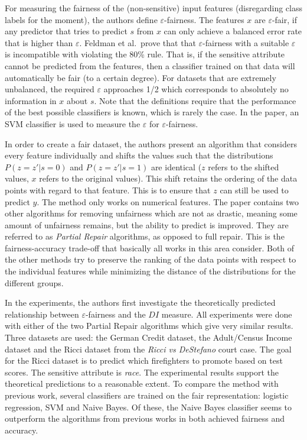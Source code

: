 For measuring the fairness of the (non-sensitive) input features
(disregarding class labels for the moment), the authors define \(\varepsilon\)-fairness.
The features \(x\) are \(\varepsilon\)-fair,
if any predictor that tries to predict \(s\) from \(x\) can only achieve a balanced error rate
that is higher than \(\varepsilon\).
Feldman et al.~prove that that \(\varepsilon\)-fairness with a suitable \(\varepsilon\)
is incompatible with violating the 80\% rule.
That is, if the sensitive attribute cannot be predicted from the features,
then a classifier trained on that data will automatically be fair (to a certain degree).
For datasets that are extremely unbalanced,
the required \(\varepsilon\) approaches 1/2
which corresponds to absolutely no information in \(x\) about \(s\).
Note that the definitions require that the performance of the best possible classifiers is known,
which is rarely the case.
In the paper, an SVM classifier is used to measure the \(\varepsilon\) for \(\varepsilon\)-fairness.

In order to create a fair dataset,
the authors present an algorithm that considers every feature individually
and shifts the values such that the distributions \(P(z=z'|s=0)\) and \(P(z=z'|s=1)\) are identical
(\(z\) refers to the shifted values, \(x\) refers to the original values).
This shift retains the ordering of the data points with regard to that feature.
This is to ensure that \(z\) can still be used to predict \(y\).
The method only works on numerical features.
The paper contains two other algorithms for removing unfairness which are not as drastic,
meaning some amount of unfairness remains, but the ability to predict is improved.
They are referred to as \emph{Partial Repair} algorithms, as opposed to full repair.
This is the fairness-accuracy trade-off that basically all works in this area consider.
Both of the other methods try to preserve the ranking of the data points
with respect to the individual features
while minimizing the distance of the distributions for the different groups.

In the experiments, the authors first investigate the theoretically predicted relationship
between \(\varepsilon\)-fairness and the \(DI\) measure.
All experiments were done with either of the two Partial Repair algorithms
which give very similar results.
Three datasets are used:
the German Credit dataset, the Adult/Census Income dataset
and the Ricci dataset from the \emph{Ricci vs DeStefano} court case.
The goal for the Ricci dataset is to predict which firefighters to promote based on test scores.
The sensitive attribute is \emph{race}.
The experimental results support the theoretical predictions to a reasonable extent.
To compare the method with previous work,
several classifiers are trained on the fair representation:
logistic regression, SVM and Naive Bayes.
Of these, the Naive Bayes classifier seems to outperform the algorithms from previous works
\citep{kamiran2009classifying,kamishima2011fairness,zemel2013learning}
in both achieved fairness and accuracy.

